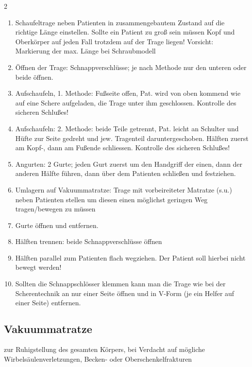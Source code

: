 \begin{multicols}{2}
\begin{enumerate}
    \item Schaufeltrage neben Patienten in zusammengebautem Zustand auf die
    richtige Länge einstellen. Sollte ein Patient zu groß sein
    müssen Kopf und Oberkörper auf jeden Fall trotzdem auf der Trage
    liegen! Vorsicht: Markierung der max. Länge bei Schraubmodell
    \item Öffnen der Trage: Schnappverschlüsse; je nach Methode nur den
    unteren oder beide öffnen.
    \item Aufschaufeln, 1. Methode: Fußseite offen, Pat. wird von oben
    kommend wie auf eine Schere aufgeladen, die Trage unter ihm
    geschlossen. Kontrolle des sicheren Schlußes!
    \item Aufschaufeln: 2. Methode: beide Teile getrennt, Pat. leicht an
    Schulter und Hüfte zur Seite gedreht und jew. Tragenteil
    daruntergeschoben. Hälften zuerst am Kopf-, dann am Fußende
    schliessen. Kontrolle des sicheren Schlußes!
    \item Angurten: 2 Gurte; jeden Gurt zuerst um den Handgriff der einen,
    dann der anderen Hälfte führen, dann über dem Patienten
    schließen und festziehen.
    \item Umlagern auf Vakuummatratze: Trage mit vorbeireiteter Matratze
    (s.u.) neben Patienten stellen um diesen einen möglichst geringen Weg
    tragen/bewegen zu müssen
    \item Gurte öffnen und entfernen.
    \item Hälften trennen: beide Schnappverschlüsse öffnen
    \item Hälften parallel zum Patienten flach wegziehen. Der Patient soll
    hierbei nicht bewegt werden!
    \item Sollten die Schnappschlösser klemmen kann man die Trage wie bei
    der Scherentechnik an nur einer Seite öffnen und in V-Form (je ein
    Helfer auf einer Seite) entfernen.
\end{enumerate}
\end{multicols}



\subsection{Vakuummatratze}
\label{topic:vakuummatratze-handhabung}

zur Ruhigstellung des gesamten Körpers, bei Verdacht auf mögliche
Wirbelsäulenverletzungen, Becken- oder Oberschenkelfrakturen %

